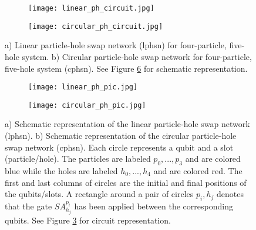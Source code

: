 \documentclass[10pt]{article}
\begin{document}
\begin{figure}[h]
\begin{centering}
\begin{subfigure}[t]{0.3\textwidth}
\hspace*{-10mm}
\texttt{[image: linear\_ph\_circuit.jpg]}
\caption{}
\label{linear_circuit}
\end{subfigure}
\hspace{4cm}
\begin{subfigure}[t]{0.3\textwidth}
\texttt{[image: circular\_ph\_circuit.jpg]}
\caption{}
\label{circular_circuit}
\end{subfigure}
\caption{a) Linear particle-hole swap network (lphsn) for four-particle, five-hole system. b) Circular particle-hole swap network for four-particle, five-hole system (cphsn). See Figure \ref{fig:dots} for schematic representation.}
\label{fig:circuits}
\end{centering}
\end{figure}

\begin{figure}[h]
\centering
\begin{subfigure}[b]{0.4\textwidth}
\texttt{[image: linear\_ph\_pic.jpg]}
\caption{}
\label{fig:linear_dots}
\end{subfigure}
\begin{subfigure}[b]{0.4\textwidth}
\texttt{[image: circular\_ph\_pic.jpg]}
\caption{}
\label{fig:circular_dots}
\end{subfigure}
\caption{a) Schematic representation of the linear particle-hole swap network (lphsn). b) Schematic representation of the circular particle-hole swap network (cphsn). Each circle represents a qubit and a slot (particle/hole). The particles are labeled $p_0,...,p_3$ and are colored blue while the holes are labeled $h_0,...,h_4$ and are colored red. The first and last columns of circles are the initial and final positions of the qubits/slots. A rectangle around a pair of circles $p_i,h_j$ denotes that the gate $SA^{p_i}_{h_j}$ has been applied between the corresponding qubits. See Figure \ref{fig:circuits} for circuit representation.}
\label{fig:dots}
\end{figure}
\end{document}
